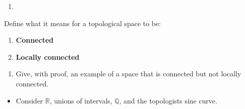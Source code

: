 \begin{problem}[?]

\begin{enumerate}
\def\labelenumi{\alph{enumi}.}
\tightlist
\item
\end{enumerate}

Define what it means for a topological space to be:

\begin{enumerate}
\def\labelenumi{\roman{enumi}.}
\item
  \textbf{Connected}
\item
  \textbf{Locally connected}
\end{enumerate}

\begin{enumerate}
\def\labelenumi{\alph{enumi}.}
\setcounter{enumi}{1}
\tightlist
\item
  Give, with proof, an example of a space that is connected but not
  locally connected.
\end{enumerate}

\end{problem}


\begin{concept}

\envlist

\begin{itemize}
\tightlist
\item
  Consider \({\mathbb{R}}\), unions of intervals, \({\mathbb{Q}}\), and
  the topologists sine curve.
\end{itemize}

\end{concept}

